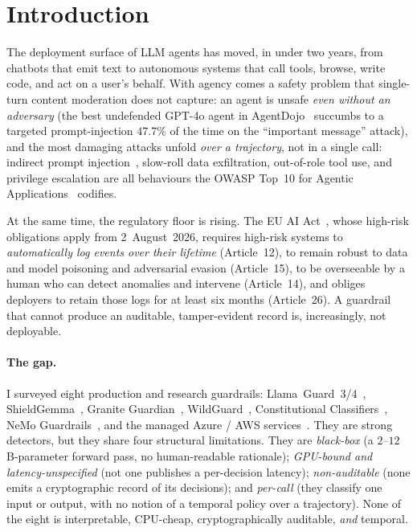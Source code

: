 \documentclass[11pt]{article}
\begin{document}
\section{Introduction}

The deployment surface of LLM agents has moved, in under two years, from
chatbots that emit text to autonomous systems that call tools, browse, write
code, and act on a user's behalf. With agency comes a safety problem that
single-turn content moderation does not capture: an agent is unsafe \emph{even
without an adversary} (the best undefended GPT-4o agent in
AgentDojo~\citep{debenedetti2024agentdojo} succumbs to a targeted
prompt-injection $47.7\%$ of the time on the ``important message'' attack), and
the most damaging attacks unfold \emph{over a trajectory}, not in a single call:
indirect prompt injection~\citep{greshake2023indirect}, slow-roll data
exfiltration, out-of-role tool use, and privilege escalation are all
behaviours the OWASP Top~10 for Agentic Applications~\citep{owasp2025agentic}
codifies.

At the same time, the regulatory floor is rising. The EU AI
Act~\citep{euaiact2024}, whose high-risk obligations apply from 2~August~2026,
requires high-risk systems to \emph{automatically log events over their
lifetime} (Article~12), to remain robust to data and model poisoning and
adversarial evasion (Article~15), to be overseeable by a human who can detect
anomalies and intervene (Article~14), and obliges deployers to retain those logs
for at least six months (Article~26). A guardrail that cannot produce an
auditable, tamper-evident record is, increasingly, not deployable.

\paragraph{The gap.} I surveyed eight production and research guardrails:
Llama~Guard~3/4~\citep{metallamaguard3,metallamaguard4},
ShieldGemma~\citep{zeng2024shieldgemma}, Granite
Guardian~\citep{ibm2024graniteguardian}, WildGuard~\citep{han2024wildguard},
Constitutional Classifiers~\citep{sharma2025constitutional}, NeMo
Guardrails~\citep{rebedea2023nemo}, and the managed Azure / AWS
services~\citep{azurepromptshields,awsbedrockguardrails}. They are strong
detectors, but they share four structural limitations. They are
\emph{black-box} (a $2$--$12$\,B-parameter forward pass, no human-readable
rationale); \emph{GPU-bound and latency-unspecified} (not one publishes a
per-decision latency); \emph{non-auditable} (none emits a cryptographic record
of its decisions); and \emph{per-call} (they classify one input or output, with
no notion of a temporal policy over a trajectory). None of the eight is
interpretable, CPU-cheap, cryptographically auditable, \emph{and} temporal.
\end{document}
